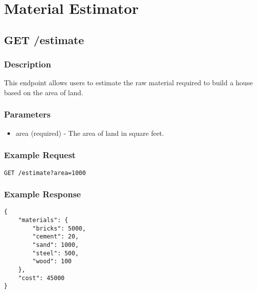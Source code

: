 \documentclass{article}
\begin{document}
\section{Material Estimator}

\subsection{GET /estimate}

\subsubsection{Description}

This endpoint allows users to estimate the raw material required to build a house based on the area of land.

\subsubsection{Parameters}

\begin{itemize}
  \item area (required) - The area of land in square feet.
\end{itemize}

\subsubsection{Example Request}

\begin{verbatim}
GET /estimate?area=1000
\end{verbatim}

\subsubsection{Example Response}

\begin{verbatim}
{
    "materials": {
        "bricks": 5000,
        "cement": 20,
        "sand": 1000,
        "steel": 500,
        "wood": 100
    },
    "cost": 45000
}
\end{verbatim}
\end{document}
